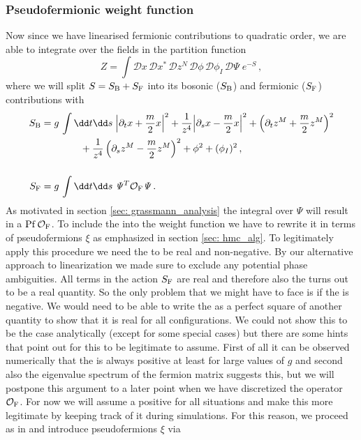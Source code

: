 \subsubsection{Pseudofermionic weight function}
Now since we have linearised fermionic contributions to quadratic order, we are able to integrate over the  fields in the partition function
%
%
\begin{equation}
Z = \int \mathcal{D}x\,\mathcal{D}x^{*}\,\mathcal{D}z^{N}\,\mathcal{D}\phi\,\mathcal{D}\phi_{I}\,\mathcal{D}\mathit{\Psi}\; e^{-S}\,,
\end{equation}
%
%
where we will split $S = S_{\rm B} + S_{\rm F}$ into its bosonic ($S_{\rm B}$) and fermionic ($S_{\rm F}$) contributions with
%
%
\begin{align}
S_{\rm B} &= g\,\int \dd t\dd s\; {\left\vert \partial_t {x} + {\frac{m}{2}}{x} \right\vert}^2 + \frac{1}{{ z}^4}{\left\vert \partial_s {x} -\frac{m}{2}{x} \right\vert}^2 + \left(\partial_t {z}^M + \frac{m}{2}{z}^M \right)^2 \notag \\ 
&\qquad\qquad+ \frac{1}{{ z}^4} \left(\partial_s {z}^M -\frac{m}{2}{z}^M\right)^2 + \phi^2 + (\phi_{I})^{2}\,, \label{eq: bos_act} \\[0.5cm]
S_{\rm F} &=  g\,\int \dd t\dd s\; \mathit{\Psi}^T \mathcal{O}_{\rm F} \mathit{\Psi}\,. \notag 
\end{align}
%
%
As motivated in section \ref{sec: grassmann_analysis} the  integral over $\mathit{\Psi}$ will result in a  ${\rm Pf}\,\mathcal{O}_{\rm F}$. To include the  into the weight function we have to rewrite it in terms of pseudofermions $\xi$ as emphasized in section \ref{sec: hmc_alg}. To legitimately apply this procedure we need the  to be real and non-negative. By our alternative approach to linearization we made sure to exclude any potential phase ambiguities. All terms in the action $S_{\rm F}$ are real and therefore also the  turns out to be a real quantity. So the only problem that we might have to face is if the  is negative. We would need to be able to write the  as a perfect square of another quantity to show that it is real for all configurations. We could not show this to be the case analytically (except for some special cases) but there are some hints that point out for this to be legitimate to assume. First of all it can be observed numerically that the  is always positive at least for large values of $g$ and second also the eigenvalue spectrum of the fermion matrix suggests this, but we will postpone this argument to a later point when we have discretized the operator $\mathcal{O}_{\rm F}$. For now we will assume a positive  for all situations and make this more legitimate by keeping track of it during simulations. For this reason, we proceed as in \cite{Roiban} and introduce pseudofermions $\xi$ via
